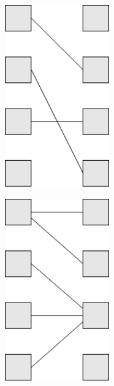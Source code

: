 \documentclass[11pt,twoside,a4paper]{report}
\begin{document}
\begin{figure}[H]
	\centering
	\begin{minipage}{0.3\textwidth}
		\vspace{-.5cm}
		\begin{center}
			\includegraphics[width=0.4\textwidth]{notacao8} %
			\label{fig:der51}
		\end{center}
	\end{minipage}%
	\begin{minipage}{0.3\textwidth}
		\begin{center}
			\includegraphics[width=0.4\textwidth]{notacao9} %
			\label{fig:der52}
		\end{center}

\end{minipage}
\end{figure}
\end{document}
